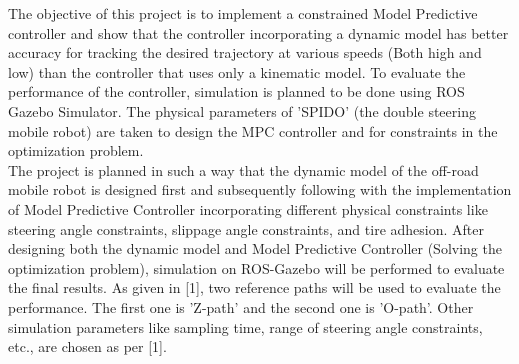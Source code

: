 \documentclass{IEEEtran}
\begin{document}
The objective of this project is to implement a constrained Model Predictive controller and show that the controller incorporating a dynamic model has better accuracy for tracking the desired trajectory at various speeds (Both high and low) than the controller that uses only a kinematic model. To evaluate the performance of the controller, simulation is planned to be done using ROS Gazebo Simulator. The physical parameters of 'SPIDO' (the double steering mobile robot) are taken to design the MPC controller and for constraints in the optimization problem.\\
The project is planned in such a way that the dynamic model of the off-road mobile robot is designed first and subsequently following with the implementation of Model Predictive Controller incorporating different physical constraints like steering angle constraints, slippage angle constraints, and tire adhesion. After designing both the dynamic model and Model Predictive Controller (Solving the optimization problem), simulation on ROS-Gazebo will be performed to evaluate the final results. As given in [1], two reference paths will be used to evaluate the performance. The first one is 'Z-path' and the second one is 'O-path'. Other simulation parameters like sampling time, range of steering angle constraints, etc., are chosen as per [1]. 
\end{document}
